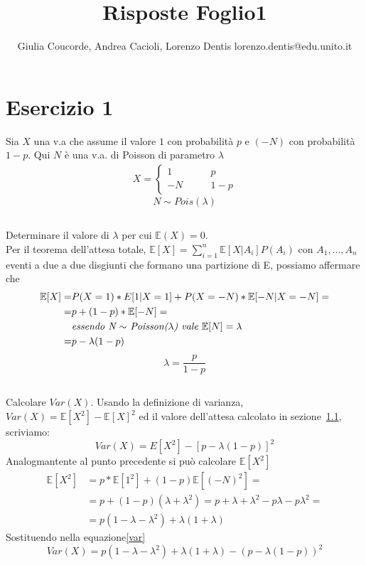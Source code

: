 \documentclass[a4paper]{article}
\newcommand{\E}[0]{\mathbb{E}}
\begin{document}
\author{Giulia Coucorde, Andrea Cacioli, Lorenzo Dentis lorenzo.dentis@edu.unito.it}
\title{Risposte Foglio1}
\maketitle
\section{Esercizio 1}
Sia $X$ una v.a che assume il valore $1$ con probabilità $p$ e $(-N)$ con probabilità $1 - p$. Qui $N$ è una v.a. di Poisson di parametro $\lambda$
\begin{align}
	X=
	\begin{cases}
		1 \qquad & p\\
		-N \qquad & 1-p
	\end{cases}
\end{align}
$$N \sim Pois(\lambda)$$ 
\subsection{}
\label{SEC:1.a}
Determinare il valore di $\lambda$ per cui $\E(X) = 0$.\\
Per il teorema dell'attesa totale, $\E[X] = \sum_{i=1}^n\E[X|A_i]P(A_i)$ con $A_1, ..., A_n$ eventi a due a due disgiunti che formano una partizione di E, possiamo affermare che
\begin{align*}
	\E[X] = & P(X=1) * E[1 | X=1] + P(X=-N)*\E[-N | X= -N]=\\
	= & p + (1-p) * \E[-N]=\\
	  & \text{\textit{essendo N $\sim$ Poisson($\lambda$) vale $\E[N] = \lambda$}}\\
	= & p - \lambda(1-p) 
\end{align*}
$$\lambda = \frac{p}{1-p}$$
\subsection{}
Calcolare $Var(X)$.
Usando la definizione di varianza, $Var(X) = \E[X^2] - \E[X]^2$  ed il valore dell'attesa calcolato in sezione~\ref{SEC:1.a}, scriviamo:
\begin{equation}\label{var}Var(X) =  E[X^2] - [p - \lambda(1-p)]^2\end{equation} 
Analogmantente al punto precedente si può calcolare $\E[X^2]$
\begin{align*}
	\E[X^2] &= p* \E[1^2] + (1-p)\E[(-N)^2]=\\
		&= p + (1-p)(\lambda + \lambda^2)= p+\lambda +\lambda^2 -p\lambda - p\lambda^2 =\\
		&= p(1-\lambda -\lambda^2) + \lambda(1+\lambda) 
\end{align*}
Sostituendo nella equazione\eqref{var}
$$Var(X) =  p(1-\lambda -\lambda^2) + \lambda(1+\lambda) - (p - \lambda(1-p))^2 $$
\end{document}
